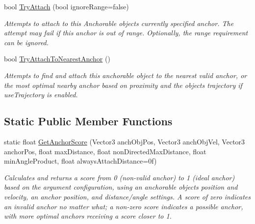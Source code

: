 \begin{DoxyCompactItemize}
bool \mbox{\hyperlink{class_leap_1_1_unity_1_1_interaction_1_1_anchorable_behaviour_acf8928aca2c223daa30c8650564b9ab0}{Try\+Attach}} (bool ignore\+Range=false)
\begin{DoxyCompactList}\small\item\em Attempts to attach to this Anchorable object\textquotesingle{}s currently specified anchor. The attempt may fail if this anchor is out of range. Optionally, the range requirement can be ignored. \end{DoxyCompactList}\item 
bool \mbox{\hyperlink{class_leap_1_1_unity_1_1_interaction_1_1_anchorable_behaviour_a526fd155d1bfdb640231bb0f5b26f159}{Try\+Attach\+To\+Nearest\+Anchor}} ()
\begin{DoxyCompactList}\small\item\em Attempts to find and attach this anchorable object to the nearest valid anchor, or the most optimal nearby anchor based on proximity and the object\textquotesingle{}s trajectory if use\+Trajectory is enabled. \end{DoxyCompactList}\end{DoxyCompactItemize}
\subsection*{Static Public Member Functions}
\begin{DoxyCompactItemize}
\item 
static float \mbox{\hyperlink{class_leap_1_1_unity_1_1_interaction_1_1_anchorable_behaviour_a72020fda147a7ba0a31c30e4b8d03b7f}{Get\+Anchor\+Score}} (Vector3 anch\+Obj\+Pos, Vector3 anch\+Obj\+Vel, Vector3 anchor\+Pos, float max\+Distance, float non\+Directed\+Max\+Distance, float min\+Angle\+Product, float always\+Attach\+Distance=0f)
\begin{DoxyCompactList}\small\item\em Calculates and returns a score from 0 (non-\/valid anchor) to 1 (ideal anchor) based on the argument configuration, using an anchorable object\textquotesingle{}s position and velocity, an anchor position, and distance/angle settings. A score of zero indicates an invalid anchor no matter what; a non-\/zero score indicates a possible anchor, with more optimal anchors receiving a score closer to 1. \end{DoxyCompactList}\end{DoxyCompactItemize}
